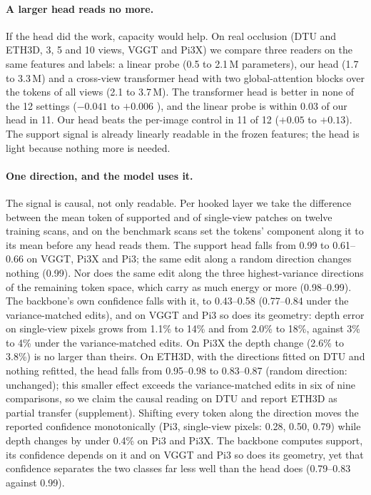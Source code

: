 \documentclass[10pt,twocolumn,letterpaper]{article}
\begin{document}
\paragraph{A larger head reads no more.}
If the head did the work, capacity would help. On real occlusion (DTU and ETH3D, 3, 5 and 10 views, VGGT and Pi3X) we compare three readers on the same features and labels: a linear probe (0.5 to 2.1\,M parameters), our head (1.7 to 3.3\,M) and a cross-view transformer head with two global-attention blocks over the tokens of all views (2.1 to 3.7\,M). The transformer head is better in none of the 12 settings ($-0.041$ to $+0.006$ \auroc), and the linear probe is within 0.03 of our head in 11. Our head beats the per-image control in 11 of 12 ($+0.05$ to $+0.13$). The support signal is already linearly readable in the frozen features; the head is light because nothing more is needed.

\paragraph{One direction, and the model uses it.}
The signal is causal, not only readable. Per hooked layer we take the difference between the mean token of supported and of single-view patches on twelve training scans, and on the benchmark scans set the tokens' component along it to its mean before any head reads them. The support head falls from \auroc{} 0.99 to 0.61--0.66 on VGGT, Pi3X and Pi3; the same edit along a random direction changes nothing (0.99). Nor does the same edit along the three highest-variance directions of the remaining token space, which carry as much energy or more (0.98--0.99). The backbone's own confidence falls with it, to 0.43--0.58 (0.77--0.84 under the variance-matched edits), and on VGGT and Pi3 so does its geometry: depth error on single-view pixels grows from 1.1\% to 14\% and from 2.0\% to 18\%, against 3\% to 4\% under the variance-matched edits. On Pi3X the depth change (2.6\% to 3.8\%) is no larger than theirs. On ETH3D, with the directions fitted on DTU and nothing refitted, the head falls from 0.95--0.98 to 0.83--0.87 (random direction: unchanged); this smaller effect exceeds the variance-matched edits in six of nine comparisons, so we claim the causal reading on DTU and report ETH3D as partial transfer (supplement). Shifting every token along the direction moves the reported confidence monotonically (Pi3, single-view pixels: 0.28, 0.50, 0.79) while depth changes by under 0.4\% on Pi3 and Pi3X. The backbone computes support, its confidence depends on it and on VGGT and Pi3 so does its geometry, yet that confidence separates the two classes far less well than the head does (0.79--0.83 against 0.99).
\end{document}
